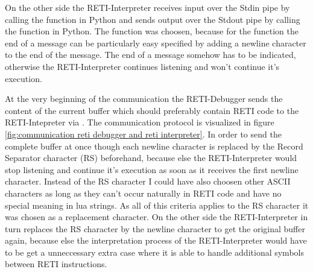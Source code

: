 \documentclass{report}
\begin{document}
On the other side the RETI-Interpreter receives input over the Stdin pipe by calling the  function in Python and sends output over the Stdout pipe by calling the  function in Python. The  function was choosen, because for the  function the end of a message can be particularly easy specified by adding a newline character  to the end of the message. The end of a message somehow has to be indicated, otherwise the RETI-Interpreter continues listening and won't continue it's execution.

At the very beginning of the communication the RETI-Debugger sends the content of the current buffer which should preferably contain RETI code to the RETI-Intepreter via  . The \alert{communication protocol} is visualized in figure \ref{fig:communication reti debugger and reti interpreter}. In order to send the complete buffer at once though each newline character  is replaced by the Record Separator character (\alert{RS})  beforehand, because else the RETI-Interpreter would stop listening and continue it's execution as soon as it receives the first newline character. Instead of the RS character I could have also choosen other ASCII characters as long as they can't occur naturally in RETI code and have no special meaning in lua strings. As all of this criteria applies to the RS character it was chosen as a replacement character. On the other side the RETI-Interpreter in turn replaces the RS character  by the newline character  to get the original buffer again, because else the interpretation process of the RETI-Interpreter would have to be get a unneccessary extra case where it is able to handle additional symbols between RETI instructions.%

\end{document}
